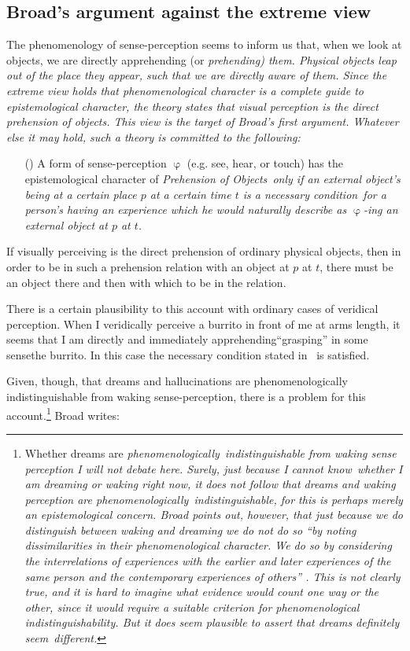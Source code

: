 \subsection{Broad's argument against the extreme view}\label{extreme}
The phenomenology of sense-perception seems to inform us that, when we look at objects, we are directly apprehending (or \em prehending\em) them. Physical objects \emph{leap} out of the place they appear, such that we are directly aware of them. Since the extreme view holds that phenomenological character is a complete guide to epistemological character, the theory states that visual perception is the direct prehension of objects. This view is the target of Broad's first argument. Whatever else it may hold, such a theory is committed to the following:
\begin{enumerate}

\item[(\PRO)] A form of sense-perception $\upvarphi$ (e.g. see, hear, or touch) has the epistemological character of \em Prehension of Objects\em\ only if an external object's being at a certain place $p$ at a certain time $t$ is a \em necessary condition\em\ for a person's having an experience which he would naturally describe as $\upvarphi$-ing an external object at $p$ at $t$. 

\end{enumerate}
If visually perceiving is the direct prehension of ordinary physical objects, then in order to be in such a prehension relation with an object at $p$ at $t$, there must be an object there and then with which to be in the relation.

There is a certain plausibility to this account with ordinary cases of veridical perception. When I veridically perceive a burrito in front of me at arms length, it seems that I am directly and immediately apprehending\textemdash``grasping'' in some sense\textemdash the burrito. In this case the necessary condition stated in \PRO\ is satisfied.

Given, though, that dreams and hallucinations are phenomenologically indistinguishable from waking sense-perception, there is a problem for this account.\footnote{Whether dreams are \em phenomenologically\em\ indistinguishable from  waking sense perception I will not debate here. Surely, just because I cannot \em know\em\ whether I am dreaming or waking right now, it does not follow that dreams and waking perception are \em phenomenologically\em\ indistinguishable, for this is perhaps merely an epistemological concern. Broad points out, however, that just because we do distinguish between waking and dreaming we do not do so ``by noting dissimilarities in their phenomenological character. We do so by considering the interrelations of experiences with the earlier and later experiences of the same person and the contemporary experiences of others'' \cite[p. 41]{Broad:1952}. This is not clearly true, and it is hard to imagine what evidence would count one way or the other, since it would require a suitable criterion for phenomenological indistinguishability. But it does seem plausible to assert that dreams definitely \em seem\em\ different.} Broad writes:

